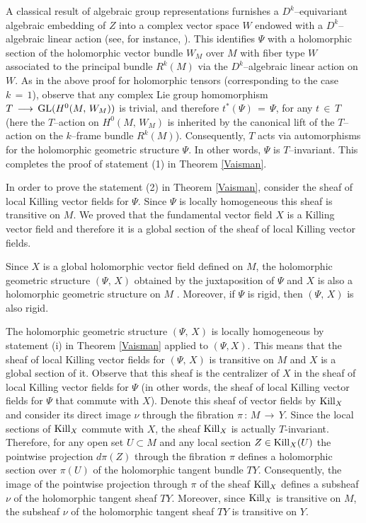 \documentclass[12pt,reqno]{amsart}
\theoremstyle{definition}
\numberwithin{equation}{section}
\begin{document}
A classical result of algebraic group representations furnishes a $D^k$--equivariant algebraic embedding 
of $Z$ into a complex vector space $W$ endowed with a $D^k$--algebraic linear action (see, for instance, 
\cite{PV}). This identifies $\Psi$ with a holomorphic section of the holomorphic vector bundle $W_M$ over 
$M$ with fiber type $W$ associated to the principal bundle $R^k(M)$ via the $D^k$--algebraic linear action 
on $W$. As in the above proof for holomorphic tensors (corresponding to the case $k\,=\,1$), observe that 
any complex Lie group homomorphism $T\,\longrightarrow\, {\rm GL} (H^0(M,\, W_M))$ is trivial, and 
therefore ${t^*}(\Psi)\,=\,\Psi$, for any $t \,\in\, T$ (here the $T$--action on $H^0(M,\, W_M)$ is 
inherited by the canonical lift of the $T$--action on the $k$--frame bundle $R^k(M)$). Consequently, $T$ 
acts via automorphisms for the holomorphic geometric structure $\Psi$. In other words, $\Psi$ is 
$T$--invariant. This completes the proof of statement (1) in Theorem \ref{Vaisman}.

In order to prove the statement (2) in Theorem \ref{Vaisman}, consider the sheaf of local Killing vector fields 
for $\Psi$. Since $\Psi$ is locally homogeneous this sheaf is transitive on $M$. We proved that the fundamental
vector field $X$ is a Killing vector field and therefore it is a global section of the sheaf of local
Killing vector fields.

Since $X$ is a global holomorphic vector field defined on $M$, the holomorphic geometric structure 
$(\Psi,\, X)$ obtained by the juxtaposition of $\Psi$ and $X$ is also a holomorphic geometric structure on 
$M$ \cite{Gr,DG, Ben}. Moreover, if $\Psi$ is rigid, then $(\Psi,\, X)$ is also rigid.

The holomorphic geometric structure $(\Psi,\,X)$ is locally homogeneous by statement (i) in Theorem 
\ref{Vaisman} applied to $(\Psi, X)$. This means that the sheaf of local Killing vector fields for $(\Psi, 
\,X)$ is transitive on $M$ and $X$ is a global section of it. Observe that this sheaf is the centralizer of 
$X$ in the sheaf of local Killing vector fields for $\Psi$ (in other words, the sheaf of local Killing 
vector fields for $\Psi$ that commute with $X$). Denote this sheaf of vector fields by ${\rm Kill}_X$ and 
consider its direct image $\nu$ through the fibration $\pi\,:\, M\,\longrightarrow\, Y$. Since the local 
sections of ${\rm Kill}_X$ commute with $X$, the sheaf ${\rm Kill}_X$ is actually $T$-invariant. Therefore, 
for any open set $U \subset M$ and any local section $Z \in {\rm Kill}_X(U)$ the pointwise projection 
$d\pi(Z)$ through the fibration $\pi$ defines a holomorphic section over $\pi(U)$ of the holomorphic tangent 
bundle $TY$. Consequently, the image of the pointwise projection through $\pi$ of the sheaf ${\rm Kill}_X$ 
defines a subsheaf $\nu$ of the holomorphic tangent sheaf $TY$. Moreover, since ${\rm Kill}_X$ is transitive 
on $M$, the subsheaf $\nu$ of the holomorphic tangent sheaf $TY$ is transitive on $Y$.
\end{document}
